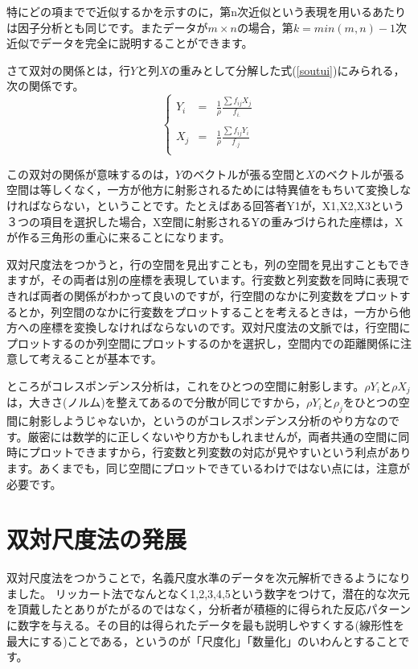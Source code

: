 \documentclass{ltjsbook}
\begin{document}
特にどの項までで近似するかを示すのに，第n次近似という表現を用いるあたりは因子分析とも同じです。またデータが$m \times n$の場合，第$k=min(m,n)-1$次近似でデータを完全に説明することができます。

さて双対の関係とは，行$Y$と列$X$の重みとして分解した式(\ref{soutui})にみられる，次の関係です。
\begin{equation}
    \label{soutui}
    \left \{
    \begin{array}{ccc}
        Y_{i} & = & \displaystyle{\frac{1}{\rho}\frac{\sum f_{ij}X_{j}}{f_{i.}}} \\
        \\
        X_{j} & = & \displaystyle{\frac{1}{\rho}\frac{\sum f_{ij}Y_{i}}{f_{.j}}} \\
    \end{array}
    \right.
\end{equation}

この双対の関係が意味するのは，$Y$のベクトルが張る空間と$X$のベクトルが張る空間は等しくなく，一方が他方に射影されるためには特異値をもちいて変換しなければならない，ということです。たとえばある回答者Y1が，X1,X2,X3という３つの項目を選択した場合，X空間に射影されるYの重みづけられた座標は，Xが作る三角形の重心に来ることになります。

双対尺度法をつかうと，行の空間を見出すことも，列の空間を見出すこともできますが，その両者は別の座標を表現しています。行変数と列変数を同時に表現できれば両者の関係がわかって良いのですが，行空間のなかに列変数をプロットするとか，列空間のなかに行変数をプロットすることを考えるときは，一方から他方への座標を変換しなければならないのです。双対尺度法の文脈では，行空間にプロットするのか列空間にプロットするのかを選択し，空間内での距離関係に注意して考えることが基本です。

ところがコレスポンデンス分析は，これをひとつの空間に射影します。$\rho Y_{i}$と$\rho X_{j}$は，大きさ(ノルム)を整えてあるので分散が同じですから，$\rho Y_{i}$と$\rho _{j}$をひとつの空間に射影しようじゃないか，というのがコレスポンデンス分析のやり方なのです。厳密には数学的に正しくないやり方かもしれませんが，両者共通の空間に同時にプロットできますから，行変数と列変数の対応が見やすいという利点があります。あくまでも，同じ空間にプロットできているわけではない点には，注意が必要です。

\section{双対尺度法の発展}
双対尺度法をつかうことで，名義尺度水準のデータを次元解析できるようになりました。
リッカート法でなんとなく1,2,3,4,5という数字をつけて，潜在的な次元を頂戴したとありがたがるのではなく，分析者が積極的に得られた反応パターンに数字を与える。その目的は得られたデータを最も説明しやすくする(線形性を最大にする)ことである，というのが「尺度化」「数量化」のいわんとすることです。
\end{document}

